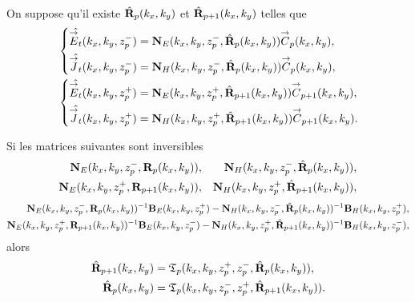     \begin{prop}%
      \label{prop:plan:synthese:reflexion}{}~

      On suppose qu'il existe \(\hat{\mathbf{R}}_{p}(k_x,k_y)\) et \(\hat{\mathbf{R}}_{p+1}(k_x,k_y)\) telles que 
      \begin{align*}
        &\left\lbrace
        \begin{aligned}
          \hat{{\overset{\rightarrow}{E}}_t}(k_x,k_y,z_p^-) &= \mathbf{N}_{E}(k_x,k_y,z_p^-,\hat{\mathbf{R}}_{p}(k_x,k_y)){\overset{\rightarrow}{C}}_{p}(k_x,k_y),
          \\
          \hat{{\overset{\rightarrow}{J}}_t}(k_x,k_y,z_p^-) &= \mathbf{N}_{H}(k_x,k_y,z_p^-,\hat{\mathbf{R}}_{p}(k_x,k_y)){\overset{\rightarrow}{C}}_{p}(k_x,k_y),
        \end{aligned}
        \right.
        \\
        &\left\lbrace
        \begin{aligned}
          \hat{{\overset{\rightarrow}{E}}_t}(k_x,k_y,z_p^+) &= \mathbf{N}_{E}(k_x,k_y,z_p^+,\hat{\mathbf{R}}_{p+1}(k_x,k_y)){\overset{\rightarrow}{C}}_{p+1}(k_x,k_y),
          \\
          \hat{{\overset{\rightarrow}{J}}_t}(k_x,k_y,z_p^+) &= \mathbf{N}_{H}(k_x,k_y,z_p^+,\hat{\mathbf{R}}_{p+1}(k_x,k_y)){\overset{\rightarrow}{C}}_{p+1}(k_x,k_y).
        \end{aligned}
        \right.
      \end{align*}

      Si les matrices suivantes sont inversibles
      \begin{align*}
        \mathbf{N}_{E}(k_x,k_y,z_p^-,\mathbf{R}_{p}(k_x,k_y)), && \mathbf{N}_{H}(k_x,k_y,z_p^-,\hat{\mathbf{R}}_{p}(k_x,k_y)),
        \\
        \mathbf{N}_{E}(k_x,k_y,z_p^+,\mathbf{R}_{p+1}(k_x,k_y)), && \mathbf{N}_{H}(k_x,k_y,z_p^+,\hat{\mathbf{R}}_{p+1}(k_x,k_y)),
      \end{align*}
      \begin{align*}
        \mathbf{N}_{E}(k_x,k_y,z_p^-,\mathbf{R}_{p}(k_x,k_y))^{-1}\mathbf{B}_{E}(k_x,k_y,z_p^+) - \mathbf{N}_{H}(k_x,k_y,z_p^-,\hat{\mathbf{R}}_{p}(k_x,k_y))^{-1}\mathbf{B}_{H}(k_x,k_y,z_p^+),
        \\
        \mathbf{N}_{E}(k_x,k_y,z_p^+,\mathbf{R}_{p+1}(k_x,k_y))^{-1}\mathbf{B}_{E}(k_x,k_y,z_p^-) - \mathbf{N}_{H}(k_x,k_y,z_p^+,\hat{\mathbf{R}}_{p+1}(k_x,k_y))^{-1}\mathbf{B}_{H}(k_x,k_y,z_p^-),
      \end{align*}
      alors
      \begin{align*}
        \hat{\mathbf{R}}_{p+1}(k_x,k_y) &= \mathfrak{T}_p(k_x,k_y,z_p^+,z_p^-,\hat{\mathbf{R}}_{p}(k_x,k_y)),
        \\
        \hat{\mathbf{R}}_{p}(k_x,k_y) &= \mathfrak{T}_p(k_x,k_y,z_p^-,z_p^+,\hat{\mathbf{R}}_{p+1}(k_x,k_y)).
      \end{align*}
    \end{prop}

